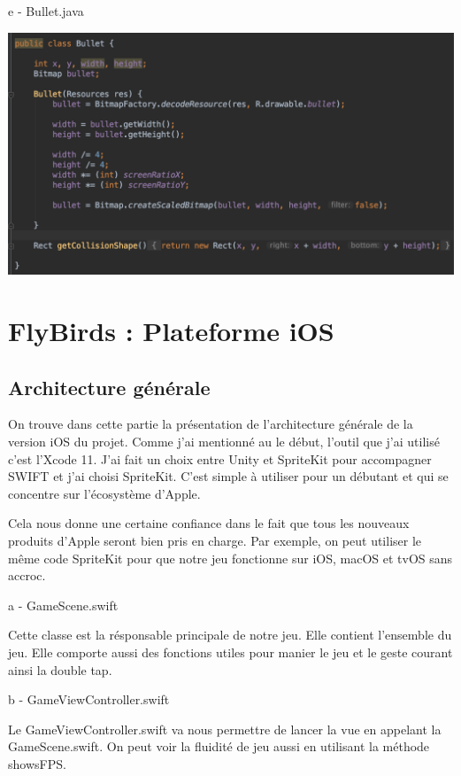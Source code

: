 \documentclass{rapportECL}
\begin{document}
e - Bullet.java

\begin{center}
    \includegraphics[scale = 0.5]{logos/Bullet.png}
\end{center}



\section{FlyBirds : Plateforme iOS}
\subsection{Architecture générale}
On trouve dans cette partie la présentation de l'architecture générale de la version iOS du projet. Comme j'ai mentionné au le début, l'outil que j'ai utilisé c'est l'Xcode\cite{xCode} 11. J'ai fait un choix entre Unity et SpriteKit\cite{Spritekit} pour accompagner SWIFT et j'ai choisi SpriteKit. C'est simple à utiliser pour un débutant et qui se concentre sur l'écosystème d'Apple.


Cela nous donne une certaine confiance dans le fait que tous les nouveaux produits d'Apple seront bien pris en charge. Par exemple, on peut utiliser le même code SpriteKit\cite{Spritekit} pour que notre jeu fonctionne sur iOS, macOS et tvOS sans accroc.\newline

a - GameScene.swift

Cette classe est la résponsable principale de notre jeu. Elle contient l'ensemble du jeu. Elle comporte aussi des fonctions utiles pour manier le jeu et le geste courant ainsi la double tap.


b - GameViewController.swift

Le GameViewController.swift va nous permettre de lancer la vue en appelant la GameScene.swift. On peut voir la fluidité de jeu aussi en utilisant la méthode showsFPS.\newline
\end{document}
